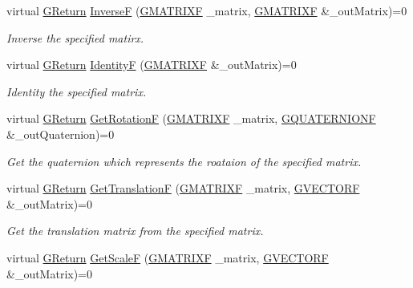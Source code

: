 \begin{DoxyCompactItemize}
virtual \mbox{\hyperlink{namespaceGW_a67a839e3df7ea8a5c5686613a7a3de21}{G\+Return}} \mbox{\hyperlink{classGW_1_1MATH_1_1GMatrix_a47cbc24d8a15f8cf605f6585c8b44e2e}{InverseF}} (\mbox{\hyperlink{structGW_1_1MATH_1_1GMATRIXF}{G\+M\+A\+T\+R\+I\+XF}} \+\_\+matrix, \mbox{\hyperlink{structGW_1_1MATH_1_1GMATRIXF}{G\+M\+A\+T\+R\+I\+XF}} \&\+\_\+out\+Matrix)=0
\begin{DoxyCompactList}\small\item\em Inverse the specified matirx. \end{DoxyCompactList}\item 
virtual \mbox{\hyperlink{namespaceGW_a67a839e3df7ea8a5c5686613a7a3de21}{G\+Return}} \mbox{\hyperlink{classGW_1_1MATH_1_1GMatrix_aee68de35de388c5893b6fcdd450dd1d3}{IdentityF}} (\mbox{\hyperlink{structGW_1_1MATH_1_1GMATRIXF}{G\+M\+A\+T\+R\+I\+XF}} \&\+\_\+out\+Matrix)=0
\begin{DoxyCompactList}\small\item\em Identity the specified matrix. \end{DoxyCompactList}\item 
virtual \mbox{\hyperlink{namespaceGW_a67a839e3df7ea8a5c5686613a7a3de21}{G\+Return}} \mbox{\hyperlink{classGW_1_1MATH_1_1GMatrix_a1c9745c2b04e1ab4d4446d65c5f0fb89}{Get\+RotationF}} (\mbox{\hyperlink{structGW_1_1MATH_1_1GMATRIXF}{G\+M\+A\+T\+R\+I\+XF}} \+\_\+matrix, \mbox{\hyperlink{structGW_1_1MATH_1_1GQUATERNIONF}{G\+Q\+U\+A\+T\+E\+R\+N\+I\+O\+NF}} \&\+\_\+out\+Quaternion)=0
\begin{DoxyCompactList}\small\item\em Get the quaternion which represents the roataion of the specified matrix. \end{DoxyCompactList}\item 
virtual \mbox{\hyperlink{namespaceGW_a67a839e3df7ea8a5c5686613a7a3de21}{G\+Return}} \mbox{\hyperlink{classGW_1_1MATH_1_1GMatrix_a5948489188390e3566f7a0fcba687c97}{Get\+TranslationF}} (\mbox{\hyperlink{structGW_1_1MATH_1_1GMATRIXF}{G\+M\+A\+T\+R\+I\+XF}} \+\_\+matrix, \mbox{\hyperlink{structGW_1_1MATH_1_1GVECTORF}{G\+V\+E\+C\+T\+O\+RF}} \&\+\_\+out\+Matrix)=0
\begin{DoxyCompactList}\small\item\em Get the translation matrix from the specified matrix. \end{DoxyCompactList}\item 
virtual \mbox{\hyperlink{namespaceGW_a67a839e3df7ea8a5c5686613a7a3de21}{G\+Return}} \mbox{\hyperlink{classGW_1_1MATH_1_1GMatrix_aaf1e6774edbb0d9e2b5074298bcae8dd}{Get\+ScaleF}} (\mbox{\hyperlink{structGW_1_1MATH_1_1GMATRIXF}{G\+M\+A\+T\+R\+I\+XF}} \+\_\+matrix, \mbox{\hyperlink{structGW_1_1MATH_1_1GVECTORF}{G\+V\+E\+C\+T\+O\+RF}} \&\+\_\+out\+Matrix)=0

\end{DoxyCompactItemize}
